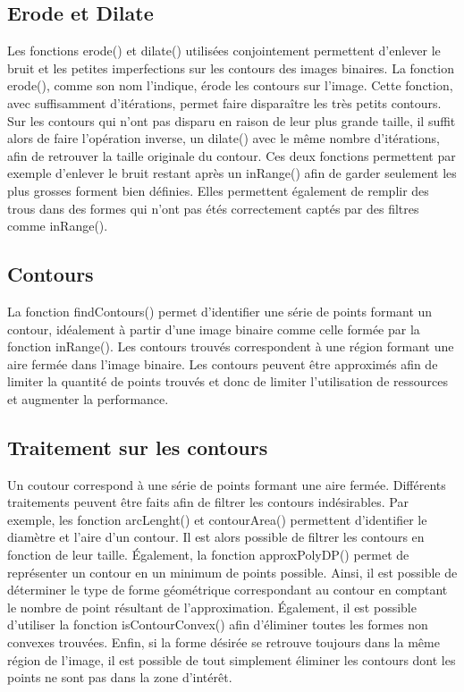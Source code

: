 \subsection{Erode et Dilate}

Les fonctions erode() et dilate() utilisées conjointement permettent d'enlever le bruit et les petites imperfections sur les contours des images binaires. La fonction erode(), comme son nom l'indique, érode les contours sur l'image. Cette fonction, avec suffisamment d'itérations, permet faire disparaître les très petits contours. Sur les contours qui n'ont pas disparu en raison de leur plus grande taille, il suffit alors de faire l'opération inverse, un dilate() avec le même nombre d'itérations, afin de retrouver la taille originale du contour. Ces deux fonctions permettent par exemple d'enlever le bruit restant après un inRange() afin de garder seulement les plus grosses forment bien définies. Elles permettent également de remplir des trous dans des formes qui n'ont pas étés correctement captés par des filtres comme inRange().

\subsection{Contours}

La fonction findContours() permet d'identifier une série de points formant un contour, idéalement à partir d'une image binaire comme celle formée par la fonction inRange(). Les contours trouvés correspondent à une région formant une aire fermée dans l'image binaire. Les contours peuvent être approximés afin de limiter la quantité de points trouvés et donc de limiter l'utilisation de ressources et augmenter la performance.

\subsection{Traitement sur les contours}

Un coutour correspond à une série de points formant une aire fermée. Différents traitements peuvent être faits afin de filtrer les contours indésirables. Par exemple, les fonction arcLenght() et contourArea() permettent d'identifier le diamètre et l'aire d'un contour. Il est alors possible de filtrer les contours en fonction de leur taille. Également, la fonction approxPolyDP() permet de représenter un contour en un minimum de points possible. Ainsi, il est possible de déterminer le type de forme géométrique correspondant au contour en comptant le nombre de point résultant de l'approximation. Également, il est possible d'utiliser la fonction isContourConvex() afin d'éliminer toutes les formes non convexes trouvées. Enfin, si la forme désirée se retrouve toujours dans la même région de l'image, il est possible de tout simplement éliminer les contours dont les points ne sont pas dans la zone d'intérêt.

